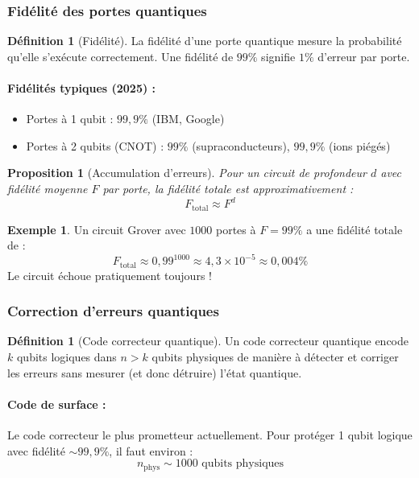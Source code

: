 \documentclass[12pt,a4paper]{article}
\newtheorem{proposition}[theorem]{Proposition}
\theoremstyle{definition}
\newtheorem{definition}[theorem]{Définition}
\newtheorem{example}[theorem]{Exemple}
\theoremstyle{remark}
\begin{document}
\subsubsection{Fidélité des portes quantiques}

\begin{definition}[Fidélité]
La fidélité d'une porte quantique mesure la probabilité qu'elle s'exécute correctement. Une fidélité de $99\%$ signifie $1\%$ d'erreur par porte.
\end{definition}

\paragraph{Fidélités typiques (2025) :}
\begin{itemize}
    \item Portes à 1 qubit : $99{,}9\%$ (IBM, Google)
    \item Portes à 2 qubits (CNOT) : $99\%$ (supraconducteurs), $99{,}9\%$ (ions piégés)
\end{itemize}

\begin{proposition}[Accumulation d'erreurs]
Pour un circuit de profondeur $d$ avec fidélité moyenne $F$ par porte, la fidélité totale est approximativement :
\[
F_{\text{total}} \approx F^d
\]
\end{proposition}

\begin{example}
Un circuit Grover avec $1000$ portes à $F = 99\%$ a une fidélité totale de :
\[
F_{\text{total}} \approx 0{,}99^{1000} \approx 4{,}3 \times 10^{-5} \approx 0{,}004\%
\]
Le circuit échoue pratiquement toujours !
\end{example}

\subsubsection{Correction d'erreurs quantiques}

\begin{definition}[Code correcteur quantique]
Un code correcteur quantique encode $k$ qubits logiques dans $n > k$ qubits physiques de manière à détecter et corriger les erreurs sans mesurer (et donc détruire) l'état quantique.
\end{definition}

\paragraph{Code de surface :}
Le code correcteur le plus prometteur actuellement. Pour protéger 1 qubit logique avec fidélité $\sim 99{,}9\%$, il faut environ :
\[
n_{\text{phys}} \sim 1000 \text{ qubits physiques}
\]
\end{document}
